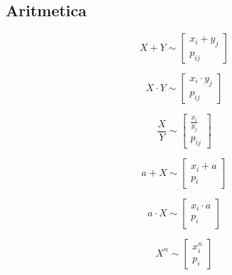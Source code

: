 \documentclass[oneside]{memoir}
\begin{document}
\subsection*{Aritmetica}
\begin{center}
    \begin{equation*}
X + Y \sim \begin{bmatrix}
    x_i+y_j \\
    p_{ij}
\end{bmatrix}
    \end{equation*}
\end{center}

\begin{center}
    \begin{equation*}
X \cdot  Y \sim \begin{bmatrix}
    x_i\cdot y_j \\
    p_{ij}
\end{bmatrix}
    \end{equation*}
\end{center}

\begin{center}
    \begin{equation*}
\frac{X}{Y} \sim \begin{bmatrix}
    \frac{x_i}{y_j} \\
    p_{ij}
\end{bmatrix}
    \end{equation*}
\end{center}

\begin{center}
    \begin{equation*}
a + X \sim \begin{bmatrix}
    x_i + a \\
    p_{i}
\end{bmatrix}
    \end{equation*}
\end{center}

\begin{center}
    \begin{equation*}
a \cdot  X \sim \begin{bmatrix}
    x_i\cdot  a \\
    p_{i}
\end{bmatrix}
    \end{equation*}
\end{center}

\begin{center}
    \begin{equation*}
X^n \sim \begin{bmatrix}
    x_i^n \\
    p_{i}
\end{bmatrix}
    \end{equation*}
\end{center}
\end{document}
